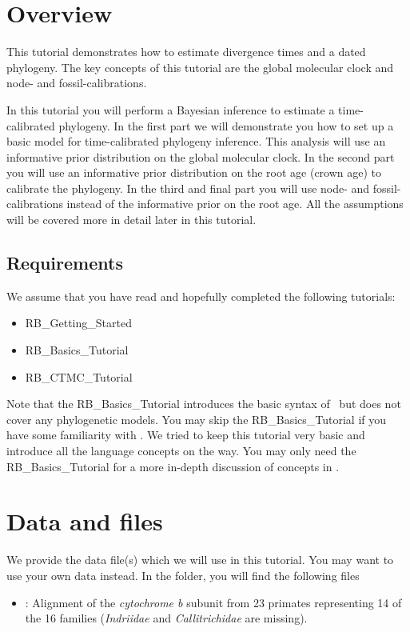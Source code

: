 \section{Overview}


This tutorial demonstrates how to estimate divergence times and a dated phylogeny. 
The key concepts of this tutorial are the global molecular clock and node- and fossil-calibrations.


In this tutorial you will perform a Bayesian inference to estimate a time-calibrated phylogeny.
In the first part we will demonstrate you how to set up a basic model for time-calibrated phylogeny inference.
This analysis will use an informative prior distribution on the global molecular clock.
In the second part you will use an informative prior distribution on the root age (crown age) to calibrate the phylogeny.
In the third and final part you will use node- and fossil-calibrations instead of the informative prior on the root age.
All the assumptions will be covered more in detail later in this tutorial.

\subsection*{Requirements}
We assume that you have read and hopefully completed the following tutorials:
\begin{itemize}
\item RB\_Getting\_Started
\item RB\_Basics\_Tutorial
\item RB\_CTMC\_Tutorial
\end{itemize}
Note that the RB\_Basics\_Tutorial introduces the basic syntax of \Rev~but does not cover any phylogenetic models.
You may skip the RB\_Basics\_Tutorial if you have some familiarity with \R.
We tried to keep this tutorial very basic and introduce all the language concepts on the way.
You may only need the RB\_Basics\_Tutorial for a more in-depth discussion of concepts in \Rev.


\section{Data and files}

We provide the data file(s) which we will use in this tutorial.
You may want to use your own data instead.
In the  folder, you will find the following files
\begin{itemize}
\item
{}: Alignment of the \textit{cytochrome b} subunit from 23 primates representing 14 of the 16 families (\textit{Indriidae} and \textit{Callitrichidae} are missing).
\end{itemize}

